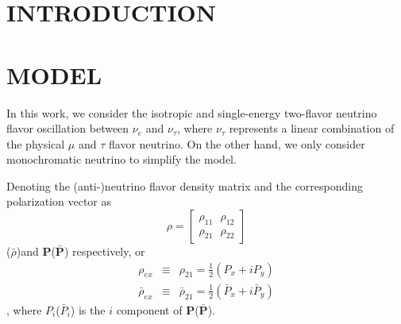 \documentclass[aps,prd,twocolumn,amsmath,amssymb,groupedaddress]{revtex4-2}
\begin{document}
\section{\label{sec:intro} INTRODUCTION}

\subsection{}
\subsubsection{}

\section{\label{sec:model} MODEL}
In this work, we consider the isotropic and single-energy two-flavor neutrino flavor oscillation between $\nu_e$ and $\nu_\tau$, where $\nu_\tau$ represents a linear combination of the physical $\mu$ and $\tau$ flavor neutrino. On the other hand, we only consider monochromatic neutrino to simplify the model.

Denoting the (anti-)neutrino flavor density matrix and the corresponding polarization vector as
\begin{equation}
	\rho = \begin{bmatrix}
		\rho_{11} ~~~ \rho_{12} \\
		\rho_{21} ~~~ \rho_{22}
	\end{bmatrix}
\end{equation}
($\bar{\rho}$)and $\textbf{P}$($\bar{\textbf{P}}$) respectively, or
\begin{eqnarray}
	\rho_{ex} &\equiv& \rho_{21} = \frac{1}{2}\left(P_x + i P_y\right) \\
	\bar{\rho}_{ex} &\equiv& \bar{\rho}_{21} = \frac{1}{2}\left(\bar{P}_x + i \bar{P}_y\right) 
\end{eqnarray}, where $P_i$($\bar{P}_i$) is the $i$ component of $\textbf{P}$($\bar{\textbf{P}}$). 
\end{document}
